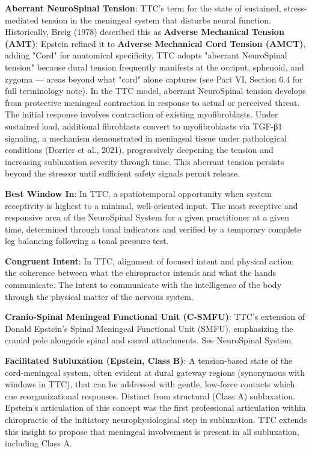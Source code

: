 \documentclass[11pt,letterpaper]{article}
\begin{document}
\textbf{Aberrant NeuroSpinal Tension}: TTC's term for the state of sustained, stress-mediated tension in the meningeal system that disturbs neural function. Historically, Breig (1978) described this as \textbf{Adverse Mechanical Tension (AMT)}; Epstein refined it to \textbf{Adverse Mechanical Cord Tension (AMCT)}, adding "Cord" for anatomical specificity. TTC adopts "aberrant NeuroSpinal tension" because dural tension frequently manifests at the occiput, sphenoid, and zygoma — areas beyond what "cord" alone captures (see Part VI, Section 6.4 for full terminology note). In the TTC model, aberrant NeuroSpinal tension develops from protective meningeal contraction in response to actual or perceived threat. The initial response involves contraction of existing myofibroblasts. Under sustained load, additional fibroblasts convert to myofibroblasts via TGF-β1 signaling, a mechanism demonstrated in meningeal tissue under pathological conditions (Dorrier et al., 2021), progressively deepening the tension and increasing subluxation severity through time. This aberrant tension persists beyond the stressor until sufficient safety signals permit release.


\textbf{Best Window In}: In TTC, a spatiotemporal opportunity when system receptivity is highest to a minimal, well-oriented input. The most receptive and responsive area of the NeuroSpinal System for a given practitioner at a given time, determined through tonal indicators and verified by a temporary complete leg balancing following a tonal pressure test.


\textbf{Congruent Intent}: In TTC, alignment of focused intent and physical action; the coherence between what the chiropractor intends and what the hands communicate. The intent to communicate with the intelligence of the body through the physical matter of the nervous system.


\textbf{Cranio-Spinal Meningeal Functional Unit (C-SMFU)}: TTC's extension of Donald Epstein's Spinal Meningeal Functional Unit (SMFU), emphasizing the cranial pole alongside spinal and sacral attachments. See NeuroSpinal System.


\textbf{Facilitated Subluxation (Epstein, Class B)}: A tension-based state of the cord-meningeal system, often evident at dural gateway regions (synonymous with windows in TTC), that can be addressed with gentle, low-force contacts which cue reorganizational responses. Distinct from structural (Class A) subluxation. Epstein's articulation of this concept was the first professional articulation within chiropractic of the initiatory neurophysiological step in subluxation. TTC extends this insight to propose that meningeal involvement is present in all subluxation, including Class A.
\end{document}
